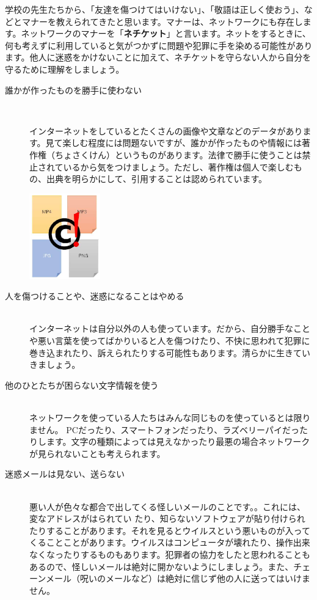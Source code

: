 \documentclass[a4paper,12pt,dvipdfmx]{jarticle}
\begin{document}

学校の先生たちから、「友達を傷つけてはいけない」、「敬語は正しく使おう」、などとマナーを教えられてきたと思います。マナーは、ネットワークにも存在します。ネットワークのマナーを「\textbf{ネチケット}」と言います。ネットをするときに、何も考えずに利用していると気がつかずに問題や犯罪に手を染める可能性があります。他人に迷惑をかけないことに加えて、ネチケットを守らない人から自分を守るために理解をしましょう。



\begin{description}

	\item[誰かが作ったものを勝手に使わない]~\\
	\begin{minipage}[b]{0.6\textwidth}
		インターネットをしているとたくさんの画像や文章などのデータがあります。見て楽しむ程度には問題ないですが、誰かが作ったものや情報には著作権（ちょさくけん）というものがあります。法律で勝手に使うことは禁止されているから気をつけましょう。ただし、著作権は個人で楽しむもの、出典を明らかにして、引用することは認められています。
	\end{minipage}\hfill
	\includegraphics[width=0.25\textwidth,height=0.20\textwidth]{ome7-img001}
	\item[人を傷つけることや、迷惑になることはやめる]~\\
	インターネットは自分以外の人も使っています。だから、自分勝手なことや悪い言葉を使ってばかりいると人を傷つけたり、不快に思われて犯罪に巻き込まれたり、訴えられたりする可能性もあります。清らかに生きていきましょう。
	\item[他のひとたちが困らない文字情報を使う]~\\
	ネットワークを使っている人たちはみんな同じものを使っているとは限りません。
	PCだったり、スマートフォンだったり、ラズベリーパイだったりします。文字の種類によっては見えなかったり最悪の場合ネットワークが見られないことも考えられます。
	\item[迷惑メールは見ない、送らない]~\\
	悪い人が色々な都合で出してくる怪しいメールのことです。。これには、変なアドレスがはられてい
	たり、知らないソフトウェアが貼り付けられたりすることがあります。それを見るとウイルスという悪いものが入ってくることことがあります。ウイルスはコンピュータが壊れたり、操作出来なくなったりするものもあります。犯罪者の協力をしたと思われることもあるので、怪しいメールは絶対に開かないようにしましょう。また、チェーンメール（呪いのメールなど）は絶対に信じず他の人に送ってはいけません。

\end{description}
\end{document}
